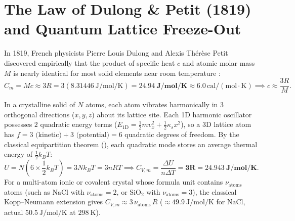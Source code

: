 \section{The Law of Dulong \& Petit (1819) and Quantum Lattice Freeze-Out}
\label{sec:04.2}

In 1819, French physicists Pierre Louis Dulong and Alexis Th\'er\`ese Petit discovered empirically that the product of specific heat $c$ and atomic molar mass $M$ is nearly identical for most solid elements near room temperature :
\begin{equation}\label{eq:04:dulongpetit}
  C_m = M c \approx 3R = 3(\SI{8.31446}{\joule\per\mole\per\kelvin}) = \mathbf{\SI{24.94}{\joule\per\mole\per\kelvin}} \approx 6.0\,\mathrm{cal/(mol\cdot\si{\kelvin})} \implies c \approx \frac{3R}{M}.
\end{equation}

\begin{derivation}
In a crystalline solid of $N$ atoms, each atom vibrates harmonically in $3$ orthogonal directions ($x,y,z$) about its lattice site. Each 1D harmonic oscillator possesses $2$ quadratic energy terms ($E_{1\mathrm{D}} = \frac{1}{2}mv_x^2 + \frac{1}{2}\kappa_s x^2$), so a 3D lattice atom has $f = 3\text{ (kinetic)} + 3\text{ (potential)} = 6$ quadratic degrees of freedom. By the classical equipartition theorem (), each quadratic mode stores an average thermal energy of $\frac{1}{2}k_B T$:
\[
  U = N \left(6 \times \frac{1}{2}k_B T\right) = 3 N k_B T = 3 n R T \implies C_{V,m} = \frac{\Delta U}{n\Delta T} = \mathbf{3R = \SI{24.943}{\joule\per\mole\per\kelvin}}.
\]
For a multi-atom ionic or covalent crystal whose formula unit contains $\nu_{\mathrm{atoms}}$ atoms (such as $\mathrm{NaCl}$ with $\nu_{\mathrm{atoms}} = 2$, or $\mathrm{SiO_2}$ with $\nu_{\mathrm{atoms}} = 3$), the classical Kopp--Neumann extension gives $C_{V,m} \approx 3\,\nu_{\mathrm{atoms}}\,R$ ($\approx \SI{49.9}{\joule\per\mole\per\kelvin}$ for $\mathrm{NaCl}$, actual $\SI{50.5}{\joule\per\mole\per\kelvin}$ at $\SI{298}{\kelvin}$).
\end{derivation}

